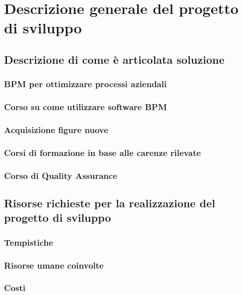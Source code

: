 

\section {Descrizione generale del progetto di sviluppo}
	\subsection{Descrizione di come è articolata soluzione}
    \subsubsection{BPM per ottimizzare processi aziendali}
   \subsubsection{Corso su come utilizzare software BPM}
      \subsubsection{Acquisizione figure nuove}
     \subsubsection{Corsi di formazione in base alle carenze rilevate} 
        \subsubsection{Corso di Quality Assurance}
  
   \subsection{Risorse richieste per la realizzazione del progetto di sviluppo}
       \subsubsection{Tempistiche}
       \subsubsection{Risorse umane coinvolte}
      \subsubsection{Costi}
